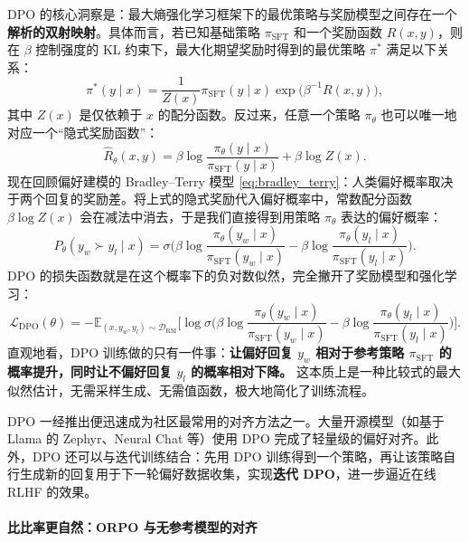 DPO 的核心洞察是：最大熵强化学习框架下的最优策略与奖励模型之间存在一个\textbf{解析的双射映射}。具体而言，若已知基础策略 $\pi_{\text{SFT}}$ 和一个奖励函数 $R(x,y)$，则在 $\beta$ 控制强度的 KL 约束下，最大化期望奖励时得到的最优策略 $\pi^*$ 满足以下关系\cite{rafailov2023direct}：
\begin{equation}\label{eq:dpo_mapping}
    \pi^*(y \mid x) = \frac{1}{Z(x)} \pi_{\text{SFT}}(y \mid x) \exp\!\big( \beta^{-1} R(x,y) \big),
\end{equation}
其中 $Z(x)$ 是仅依赖于 $x$ 的配分函数。反过来，任意一个策略 $\pi_\theta$ 也可以唯一地对应一个“隐式奖励函数”：
\begin{equation}\label{eq:dpo_implicit_reward}
    \hat{R}_\theta(x,y) = \beta \log \frac{\pi_\theta(y \mid x)}{\pi_{\text{SFT}}(y \mid x)} + \beta \log Z(x).
\end{equation}
现在回顾偏好建模的 Bradley–Terry 模型 \eqref{eq:bradley_terry}：人类偏好概率取决于两个回复的奖励差。将上式的隐式奖励代入偏好概率中，常数配分函数 $\beta \log Z(x)$ 会在减法中消去，于是我们直接得到用策略 $\pi_\theta$ 表达的偏好概率：
\begin{equation}
    P_\theta(y_w \succ y_l \mid x) = \sigma\!\Big( \beta \log \frac{\pi_\theta(y_w \mid x)}{\pi_{\text{SFT}}(y_w \mid x)} - \beta \log \frac{\pi_\theta(y_l \mid x)}{\pi_{\text{SFT}}(y_l \mid x)} \Big).
\end{equation}
DPO 的损失函数就是在这个概率下的负对数似然，完全撇开了奖励模型和强化学习：
\begin{equation}\label{eq:dpo_loss}
    \mathcal{L}_{\text{DPO}}(\theta) = -\mathbb{E}_{(x, y_w, y_l) \sim \mathcal{D}_{\text{RM}}} \Big[ \log \sigma\Big(
        \beta \log \frac{\pi_\theta(y_w \mid x)}{\pi_{\text{SFT}}(y_w \mid x)} - \beta \log \frac{\pi_\theta(y_l \mid x)}{\pi_{\text{SFT}}(y_l \mid x)}
    \Big) \Big].
\end{equation}
直观地看，DPO 训练做的只有一件事：\textbf{让偏好回复 $y_w$ 相对于参考策略 $\pi_{\text{SFT}}$ 的概率提升，同时让不偏好回复 $y_l$ 的概率相对下降。} 这本质上是一种比较式的最大似然估计，无需采样生成、无需值函数，极大地简化了训练流程。

DPO 一经推出便迅速成为社区最常用的对齐方法之一。大量开源模型（如基于 Llama 的 Zephyr、Neural Chat 等）使用 DPO 完成了轻量级的偏好对齐。此外，DPO 还可以与迭代训练结合：先用 DPO 训练得到一个策略，再让该策略自行生成新的回复用于下一轮偏好数据收集，实现\textbf{迭代 DPO}，进一步逼近在线 RLHF 的效果\cite{xu2023some}。

\paragraph{比比率更自然：ORPO 与无参考模型的对齐}

